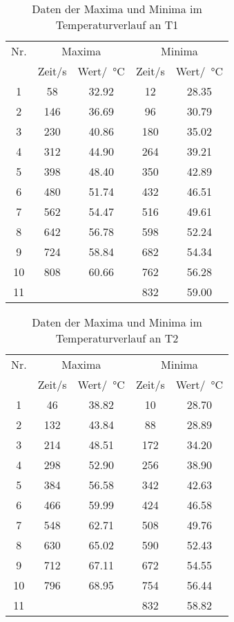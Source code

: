 \begin{table}
  \centering
  \begin{tabular}{c|c|c|c|c}
    \toprule
    Nr. &\multicolumn{2}{c}{Maxima} & \multicolumn{2}{c}{Minima}\\
         &Zeit/s & Wert/\SI{}{\degreeCelsius} & Zeit/s & Wert/\SI{}{\degreeCelsius}\\
    \midrule
    1 & 58 & 32.92&12   &28.35\\
    2 & 146& 36.69&96  &30.79\\
    3 & 230 & 40.86&180&35.02\\
    4 & 312 & 44.90&264&39.21\\
    5 & 398 & 48.40&350&42.89\\
    6 & 480 & 51.74&432&46.51\\
    7 & 562 & 54.47&516&49.61\\
    8 & 642 & 56.78&598&52.24\\
    9 & 724 & 58.84&682&54.34\\
    10& 808& 60.66&762&56.28\\
   11 &        &       &832&59.00\\
    \bottomrule
  \end{tabular}
  \caption{Daten der Maxima und Minima im Temperaturverlauf an T1}
  \label{tab:daten_t1}
\end{table}

\begin{table}
  \centering
  \begin{tabular}{c|c|c|c|c}
    \toprule
    Nr. &\multicolumn{2}{c}{Maxima} & \multicolumn{2}{c}{Minima}\\
         &Zeit/s & Wert/\SI{}{\degreeCelsius} & Zeit/s & Wert/\SI{}{\degreeCelsius}\\
    \midrule
    1 & 46 & 38.82&10   &28.70\\
    2 & 132& 43.84&88  &28.89\\
    3 & 214 & 48.51&172&34.20\\
    4 & 298 & 52.90&256&38.90\\
    5 & 384 & 56.58&342&42.63\\
    6 & 466 & 59.99&424&46.58\\
    7 & 548 & 62.71&508&49.76\\
    8 & 630 & 65.02&590&52.43\\
    9 & 712 & 67.11&672&54.55\\
    10& 796& 68.95&754&56.44\\
   11 &        &       &832&58.82\\
    \bottomrule
  \end{tabular}
  \caption{Daten der Maxima und Minima im Temperaturverlauf an T2}
  \label{tab:daten_t2}
\end{table}

